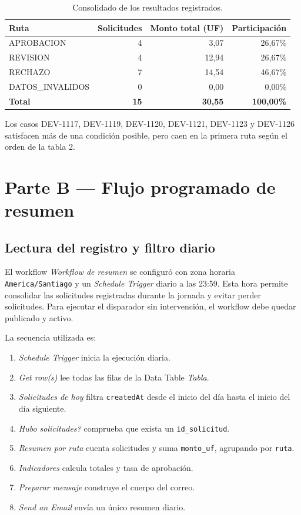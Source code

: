 \documentclass[11pt,letterpaper]{article}
\begin{document}
\begin{table}[H]
\centering
\caption{Consolidado de los resultados registrados.}
\begin{tabular}{lrrr}
\toprule
\textbf{Ruta} & \textbf{Solicitudes} & \textbf{Monto total (UF)} & \textbf{Participación} \\
\midrule
APROBACION & 4 & 3,07 & 26,67\% \\
REVISION & 4 & 12,94 & 26,67\% \\
RECHAZO & 7 & 14,54 & 46,67\% \\
DATOS\_INVALIDOS & 0 & 0,00 & 0,00\% \\
\midrule
\textbf{Total} & \textbf{15} & \textbf{30,55} & \textbf{100,00\%} \\
\bottomrule
\end{tabular}
\end{table}

Los casos DEV-1117, DEV-1119, DEV-1120, DEV-1121, DEV-1123 y DEV-1126 satisfacen más de una condición posible, pero caen en la primera ruta según el orden de la tabla 2.

\section{Parte B --- Flujo programado de resumen}

\subsection{Lectura del registro y filtro diario}
El workflow \textit{Workflow de resumen} se configuró con zona horaria \texttt{America/Santiago} y un \textit{Schedule Trigger} diario a las 23:59. Esta hora permite consolidar las solicitudes registradas durante la jornada y evitar perder solicitudes. Para ejecutar el disparador sin intervención, el workflow debe quedar publicado y activo.

La secuencia utilizada es:

\begin{enumerate}
    \item \textit{Schedule Trigger} inicia la ejecución diaria.
    \item \textit{Get row(s)} lee todas las filas de la Data Table \textit{Tabla}.
    \item \textit{Solicitudes de hoy} filtra \texttt{createdAt} desde el inicio del día hasta el inicio del día siguiente.
    \item \textit{Hubo solicitudes?} comprueba que exista un \texttt{id\_solicitud}.
    \item \textit{Resumen por ruta} cuenta solicitudes y suma \texttt{monto\_uf}, agrupando por \texttt{ruta}.
    \item \textit{Indicadores} calcula totales y tasa de aprobación.
    \item \textit{Preparar mensaje} construye el cuerpo del correo.
    \item \textit{Send an Email} envía un único resumen diario.
\end{enumerate}
\end{document}
